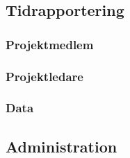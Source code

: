 \documentclass[a4paper]{article}
\begin{document}







\subsection{Tidrapportering}

\subsubsection{Projektmedlem}

\subsubsection{Projektledare}

\subsubsection{Data}








\subsection{Administration}
\end{document}
